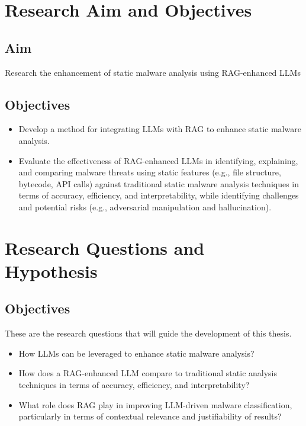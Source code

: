 \section{Research Aim and Objectives}

\subsection{Aim}
Research the enhancement of static malware analysis using RAG-enhanced LLMs

\subsection{Objectives}
\begin{itemize}
	\item Develop a method for integrating LLMs with RAG to enhance static malware analysis.
	\item Evaluate the effectiveness of RAG-enhanced LLMs in identifying, explaining, and comparing malware
	      threats using static features (e.g., file structure, bytecode, API calls) against traditional
	      static malware analysis techniques in terms of accuracy, efficiency, and interpretability, while
	      identifying challenges and potential risks (e.g., adversarial manipulation and hallucination).
\end{itemize}

\section{Research Questions and Hypothesis}

\subsection{Objectives}
These are the research questions that will guide the development of this thesis.
\begin{itemize}
	\item How LLMs can be leveraged to enhance static malware analysis?
	\item How does a RAG-enhanced LLM compare to traditional static analysis techniques in terms of accuracy,
	      efficiency, and interpretability?
	\item What role does RAG play in improving LLM-driven malware classification, particularly in terms of
	      contextual relevance and justifiability of results?
\end{itemize}


